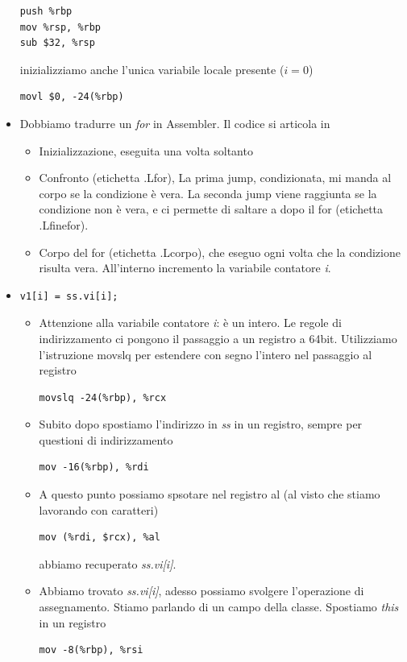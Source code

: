 \documentclass[11pt]{report}
\theoremstyle{definition}
\begin{document}
\begin{itemize}
\begin{verbatim}
push %rbp
mov %rsp, %rbp
sub $32, %rsp
\end{verbatim}
inizializziamo anche l'unica variabile locale presente ($i=0$)
\begin{verbatim}
movl $0, -24(%rbp)
\end{verbatim}
\item Dobbiamo tradurre un \emph{for} in Assembler. Il codice si articola in
\begin{itemize}
\item Inizializzazione, eseguita una volta soltanto
\item Confronto (etichetta .Lfor), La prima jump, condizionata, mi manda al corpo se la condizione è vera. La seconda jump viene raggiunta se la condizione non è vera, e ci permette di saltare a dopo il for (etichetta .Lfinefor).
\item Corpo del for (etichetta .Lcorpo), che eseguo ogni volta che la condizione risulta vera. All'interno incremento la variabile contatore \emph{i}.
\end{itemize}
\item \begin{verbatim}
v1[i] = ss.vi[i];
\end{verbatim}
\begin{itemize}
\item Attenzione alla variabile contatore \emph{i}: è un intero. Le regole di indirizzamento ci pongono il passaggio a un registro a 64bit. Utilizziamo l'istruzione movslq per estendere con segno l'intero nel passaggio al registro
\begin{verbatim}
movslq -24(%rbp), %rcx
\end{verbatim}
\item Subito dopo spostiamo l'indirizzo in \emph{ss} in un registro, sempre per questioni di indirizzamento
\begin{verbatim}
mov -16(%rbp), %rdi
\end{verbatim}
\item A questo punto possiamo spsotare nel registro al (al visto che stiamo lavorando con caratteri)
\begin{verbatim}
mov (%rdi, $rcx), %al
\end{verbatim}
abbiamo recuperato \emph{ss.vi[i]}.
\item Abbiamo trovato \emph{ss.vi[i]}, adesso possiamo svolgere l'operazione di assegnamento. Stiamo parlando di un campo della classe. Spostiamo \emph{this} in un registro
\begin{verbatim}
mov -8(%rbp), %rsi
\end{verbatim}

\end{itemize}
\end{itemize}
\end{document}
